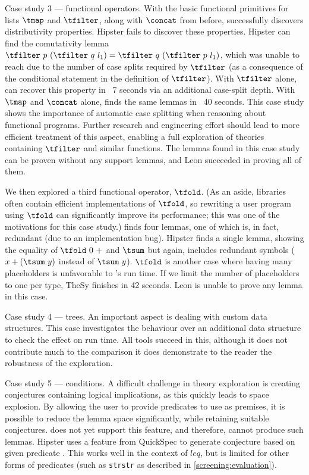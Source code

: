 \begin{myparagraph}{Case study 3 --- functional operators.}
With the basic functional primitives for lists $\tmap$ and $\tfilter$, along with $\concat$ from before, \TheSy successfully discovers distributivity properties. Hipster fails to discover these properties.
Hipster can find the comutativity lemma $\tfilter~p~(\tfilter~q~l_1) = \tfilter~q~(\tfilter~p~l_1)$, which \TheSy was unable to reach due to the number of case splits required by $\tfilter$ (as a consequence of the conditional statement in the definition of $\tfilter$).
With $\tfilter$ alone, \TheSy can recover this property in ~7 seconds via an additional case-split depth.
With $\tmap$ and $\concat$ alone, \TheSy finds the same lemmas in ~40 seconds.
This case study shows the importance of automatic case splitting when reasoning about functional programs.
Further research and engineering effort should lead to more efficient treatment of this aspect, enabling a full exploration of theories containing $\tfilter$ and similar functions.
The lemmas found in this case study can be proven without any support lemmas, and Leon succeeded in proving all of them.

We then explored a third functional operator, $\tfold$.
(As an aside, libraries often contain efficient implementations of $\tfold$, so rewriting a user program using $\tfold$ can significantly improve its performance; this was one of the motivations for this case study.)
\TheSy finds four lemmas, one of which is, in fact, redundant (due to an implementation bug).
Hipster finds a single lemma, showing the equality of $\tfold~0~+$ and $\tsum$ but again, includes redundant symbols ($x + (\tsum~y)$ instead of $\tsum~y$).
$\tfold$ is another case where having many placeholders is unfavorable to \TheSy's run time.
If we limit the number of placeholders to one per type, TheSy finishes in 42 seconds.
Leon is unable to prove any lemma in this case.
\end{myparagraph}

\begin{myparagraph}{Case study 4 --- trees.}
An important aspect is dealing with custom data structures.
This case investigates the behaviour over an additional data structure to check the effect on run time. 
All tools succeed in this, although it does not contribute much to the comparison it does demonstrate to the reader the robustness of the exploration.
\end{myparagraph}

\begin{myparagraph}{Case study 5 --- conditions.}
A difficult challenge in theory exploration is creating conjectures containing logical implications, as this quickly leads to space explosion.
By allowing the user to provide predicates to use as premises, it is possible to reduce the lemma space significantly, while retaining suitable conjectures.
\TheSy does not yet support this feature, and therefore, cannot produce such lemmas.
Hipster uses a feature from QuickSpec to generate conjecture based on given predicate \cite{hipstercond}.
This works well in the context of $leq$, but is limited for other forms of predicates (such as \texttt{strstr} as described in \autoref{screening:evaluation}).
\end{myparagraph}
